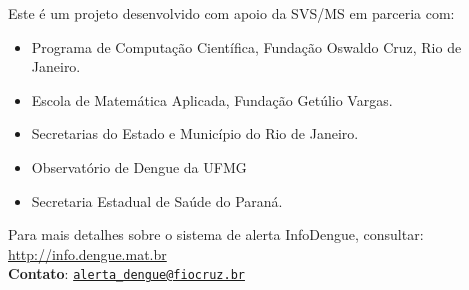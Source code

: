 \documentclass[10pt]{article} %
\begin{document}
\begin{minipage}[t]{1\linewidth}
\hypertarget{creditos}{}

Este é um projeto desenvolvido com apoio da SVS/MS em parceria com:

\begin{itemize}
\item Programa de Computação Científica, Fundação Oswaldo Cruz, Rio de Janeiro.
\item Escola de Matemática Aplicada, Fundação Getúlio Vargas.
\item Secretarias do Estado e Município do Rio de Janeiro.
\item Observatório de Dengue da UFMG
\item Secretaria Estadual de Saúde do Paraná.
\end{itemize}

      \BackToContents %

\vspace{1cm}

\hline
Para mais detalhes sobre o sistema de alerta InfoDengue, consultar: \url{http://info.dengue.mat.br}\\

\textbf{Contato}: \href{alerta\_dengue@fiocruz.br}{\nolinkurl{alerta\_dengue@fiocruz.br} }
\end{minipage} %
\end{document}
